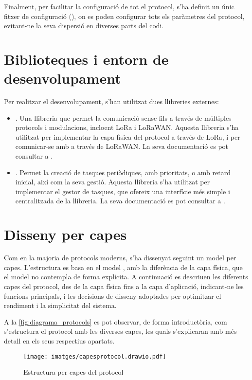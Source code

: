 \documentclass{tfgitic}[2024/07/01]
\begin{document}
Finalment, per facilitar la configuració de tot el protocol, s'ha definit un únic fitxer de configuració (), on es poden configurar tots els paràmetres del protocol, evitant-ne la seva dispersió en diverses parts del codi.

\section{Biblioteques i entorn de desenvolupament}
Per realitzar el desenvolupament, s'han utilitzat dues llibreries externes:
\begin{itemize}
    \item {}. Una llibreria que permet la comunicació sense fils a través de múltiples protocols i modulacions, incloent LoRa i LoRaWAN. Aquesta llibreria s'ha utilitzat per implementar la capa física del protocol a través de LoRa, i per comunicar-se amb  a través de LoRaWAN. La seva documentació es pot consultar a \cite{jan_gromes_radiolib_nodate}. 
    \item {}. Permet la creació de tasques periòdiques, amb prioritats, o amb retard inicial, així com la seva gestió. Aquesta llibreria s'ha utilitzat per implementar el gestor de tasques, que ofereix una interfície més simple i centralitzada de la llibreria. La seva documentació es pot consultar a \cite{arkhipenko_taskscheduler_nodate}.
\end{itemize}

\section{Disseny per capes}
Com en la majoria de protocols moderns, s'ha dissenyat seguint un model per capes. L'estructura es basa en el model , amb la diferència de la capa física, que el model  no contempla de forma explícita. 
A continuació es descriuen les diferents capes del protocol, des de la capa física fins a la capa d’aplicació, indicant-ne les funcions principals, i les decisions de disseny adoptades per optimitzar el rendiment i la simplicitat del sistema.

A la \autoref{fig:diagrama_protocols} es pot observar, de forma introductòria, com s'estructura el protocol amb les diverses capes, les quals s'explicaran amb més detall en els seus respectius apartats. 
\begin{figure}
    \centering
    \texttt{[image: imatges/capesprotocol.drawio.pdf]}
    \caption{Estructura per capes del protocol}
    \label{fig:diagrama_protocols}
\end{figure}
\end{document}
